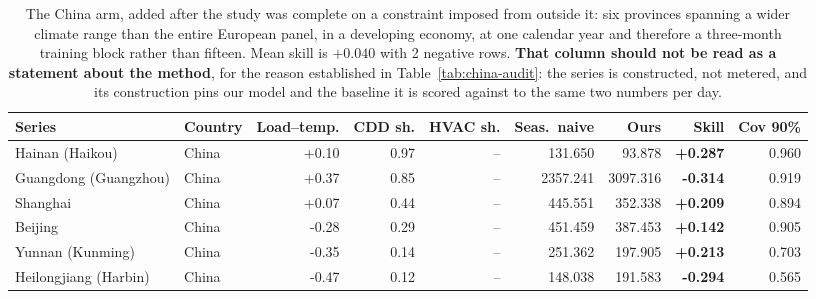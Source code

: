 \begin{table}[t]
\centering
\scriptsize
\setlength{\tabcolsep}{3pt}
\begin{tabular}{llrrrrrrr}
\toprule
Series & Country & Load--temp. & CDD sh. & HVAC sh. & Seas.\ naive & Ours & Skill & Cov 90\% \\
\midrule
Hainan (Haikou) & China & +0.10 & 0.97 & -- & 131.650 & 93.878 & \textbf{+0.287} & 0.960 \\
Guangdong (Guangzhou) & China & +0.37 & 0.85 & -- & 2357.241 & 3097.316 & \textbf{-0.314} & 0.919 \\
Shanghai & China & +0.07 & 0.44 & -- & 445.551 & 352.338 & \textbf{+0.209} & 0.894 \\
Beijing & China & -0.28 & 0.29 & -- & 451.459 & 387.453 & \textbf{+0.142} & 0.905 \\
Yunnan (Kunming) & China & -0.35 & 0.14 & -- & 251.362 & 197.905 & \textbf{+0.213} & 0.703 \\
Heilongjiang (Harbin) & China & -0.47 & 0.12 & -- & 148.038 & 191.583 & \textbf{-0.294} & 0.565 \\
\bottomrule
\end{tabular}
\caption{The China arm, added after the study was complete on a constraint imposed from outside it: six provinces spanning a wider climate range than the entire European panel, in a developing economy, at one calendar year and therefore a three-month training block rather than fifteen. Mean skill is $+0.040$ with 2 negative rows. \textbf{That column should not be read as a statement about the method}, for the reason established in Table~\ref{tab:china-audit}: the series is constructed, not metered, and its construction pins our model and the baseline it is scored against to the same two numbers per day.}
\label{tab:china}
\end{table}

